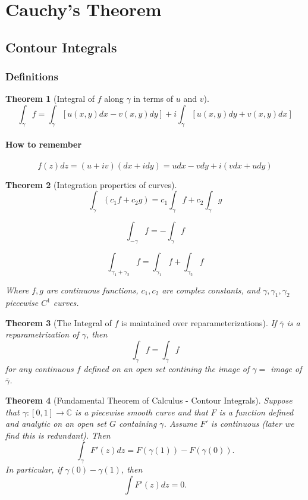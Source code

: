 \documentclass[a4paper]{article}
\newtheorem{theorem}{Theorem}
\newcommand{\C}{\mathbb{C}}
\begin{document}
\section{Cauchy's Theorem}

\subsection{Contour Integrals}

\subsubsection{Definitions}


\begin{theorem}[Integral of $f$ along $\gamma$ in terms of $u$ and $v$]
  \[
  \int_\gamma f = \int_\gamma [u(x, y) dx - v(x, y)dy] + i \int_\gamma [u(x, y)dy + v(x, y)dx]
  \]
  \paragraph{How to remember}
  \[f(z) dz = (u + iv)(dx + i dy) = u dx - v dy + i(v dx + u dy)\]

\end{theorem}




\begin{theorem}[Integration properties of curves]
  \[
    \int_\gamma (c_1 f + c_2 g) = c_1 \int_\gamma f + c_2 \int_\gamma g
  \]

  \[
    \int_{-\gamma} f = - \int_\gamma f
  \]

  \[
    \int_{\gamma_1 + \gamma_2} f = \int_{\gamma_1} f + \int_{\gamma_2} f 
  \]

  Where $f, g$ are continuous functions, $c_1, c_2$ are complex constants, and $\gamma, \gamma_1, \gamma_2$ piecewise $C^1$ curves. 
\end{theorem}



\begin{theorem}[The Integral of $f$ is maintained over reparameterizations]
  If $\bar{\gamma}$  is a reparametrization  of $\gamma$, then 
  \[
    \int_\gamma f = \int_{\bar{\gamma}} f
  \]
  for any continuous $f$ defined on an open set contining the image of $\gamma = $ image of $\bar{\gamma}$.
\end{theorem}



\begin{theorem}[Fundamental Theorem of Calculus - Contour Integrals]
  Suppose that $\gamma : [0, 1] \to \C$ is a piecewise smooth curve and that $F$ is a function defined and analytic on an open set $G$ containing $\gamma$. Assume $F'$ is continuous (later we find this is redundant). Then 
  \[
    \int_\gamma F'(z) dz = F(\gamma(1)) - F(\gamma(0)).
  \]
  In particular, if $\gamma(0) - \gamma(1)$, then 
  \[
    \int F'(z)dz = 0.
  \]
\end{theorem}
\end{document}
